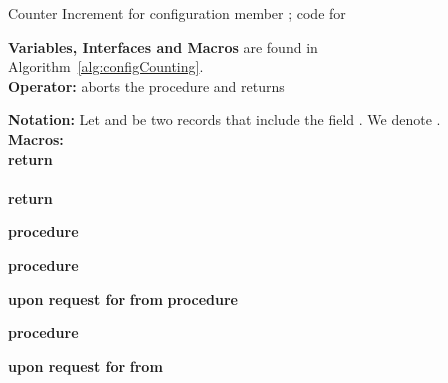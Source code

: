 \documentclass[11pt]{article}
\begin{document}
\begin{algorithm*}[t!]
   \caption{Counter Increment for configuration member ; code for }

\label{alg:cntrIncrMember}
\begin{footnotesize}
{\bf Variables, Interfaces and Macros} are found in Algorithm~\ref{alg:configCounting}. \\
\textbf{Operator:}  aborts the procedure and returns 

{\bf Notation:} Let  and  be two records that include the field . We denote        .\\
{\bf Macros:}\\  {\bf return} \\
	  \\
 {\bf return} 
	
\BlankLine



{\bf procedure}  

{\bf procedure}  	


{\bf upon request for}  {\bf from}  
\vspace{.1em}
{\bf procedure}  \Begin{		
		\;\; 
;}



{\bf procedure}  

{\bf upon request for}  {\bf from}  


\end{footnotesize}
\end{algorithm*} 
\end{document}

